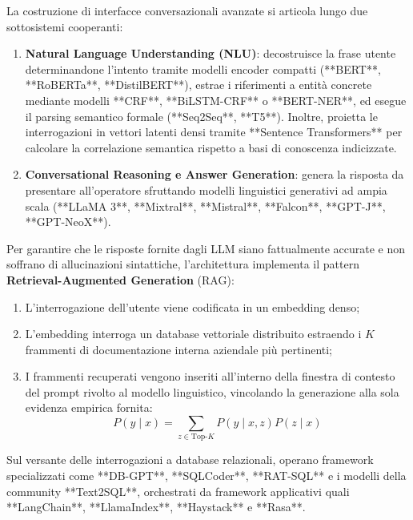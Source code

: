 \documentclass[11pt, a4paper]{article}
\begin{document}
La costruzione di interfacce conversazionali avanzate si articola lungo due sottosistemi cooperanti:
\begin{enumerate}
    \item \textbf{Natural Language Understanding (NLU)}: decostruisce la frase utente determinandone l'intento tramite modelli encoder compatti (**BERT**, **RoBERTa**, **DistilBERT**), estrae i riferimenti a entità concrete mediante modelli **CRF**, **BiLSTM-CRF** o **BERT-NER**, ed esegue il parsing semantico formale (**Seq2Seq**, **T5**). Inoltre, proietta le interrogazioni in vettori latenti densi tramite **Sentence Transformers** per calcolare la correlazione semantica rispetto a basi di conoscenza indicizzate.
    \item \textbf{Conversational Reasoning e Answer Generation}: genera la risposta da presentare all'operatore sfruttando modelli linguistici generativi ad ampia scala (**LLaMA 3**, **Mixtral**, **Mistral**, **Falcon**, **GPT-J**, **GPT-NeoX**).
\end{enumerate}

Per garantire che le risposte fornite dagli LLM siano fattualmente accurate e non soffrano di allucinazioni sintattiche, l'architettura implementa il pattern \textbf{Retrieval-Augmented Generation} (RAG):
\begin{enumerate}
    \item L'interrogazione dell'utente viene codificata in un embedding denso;
    \item L'embedding interroga un database vettoriale distribuito estraendo i $K$ frammenti di documentazione interna aziendale più pertinenti;
    \item I frammenti recuperati vengono inseriti all'interno della finestra di contesto del prompt rivolto al modello linguistico, vincolando la generazione alla sola evidenza empirica fornita:
    \begin{equation}
        P(y \mid x) = \sum_{z \in \text{Top-}K} P(y \mid x, z) P(z \mid x)
    \end{equation}
\end{enumerate}

Sul versante delle interrogazioni a database relazionali, operano framework specializzati come **DB-GPT**, **SQLCoder**, **RAT-SQL** e i modelli della community **Text2SQL**, orchestrati da framework applicativi quali **LangChain**, **LlamaIndex**, **Haystack** e **Rasa**.

\newpage

\end{document}
